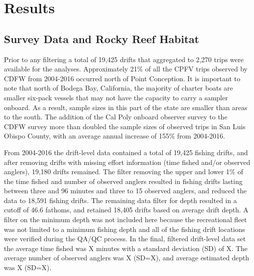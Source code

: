 \documentclass[
  12pt,
  authoryear,
  preprint,
  3p]{elsarticle}
\begin{document}
\hypertarget{results}{%
\section{Results}\label{results}}

\hypertarget{survey-data-and-rocky-reef-habitat}{%
\subsection{Survey Data and Rocky Reef
Habitat}\label{survey-data-and-rocky-reef-habitat}}

Prior to any filtering a total of 19,425 drifts that aggregated to 2,270
trips were available for the analyses. Approximately 21\% of all the
CPFV trips observed by CDFW from 2004-2016 occurred north of Point
Conception. It is important to note that north of Bodega Bay,
California, the majority of charter boats are smaller six-pack vessels
that may not have the capacity to carry a sampler onboard. As a result,
sample sizes in this part of the state are smaller than areas to the
south. The addition of the Cal Poly onboard observer survey to the CDFW
survey more than doubled the sample sizes of observed trips in San Luis
Obispo County, with an average annual increase of 155\% from 2004-2016.

From 2004-2016 the drift-level data contained a total of 19,425 fishing
drifts, and after removing drifts with missing effort information (time
fished and/or observed anglers), 19,180 drifts remained. The filter
removing the upper and lower 1\% of the time fished and number of
observed anglers resulted in fishing drifts lasting between three and 96
minutes and three to 15 observed anglers, and reduced the data to 18,591
fishing drifts. The remaining data filter for depth resulted in a cutoff
of 46.6 fathoms, and retained 18,405 drifts based on average drift
depth. A filter on the minimum depth was not included here because the
recreational fleet was not limited to a minimum fishing depth and all of
the fishing drift locations were verified during the QA/QC process. In
the final, filtered drift-level data set the average time fished was X
minutes with a standard deviation (SD) of X. The average number of
observed anglers was X (SD=X), and average estimated depth was X (SD=X).
\end{document}
